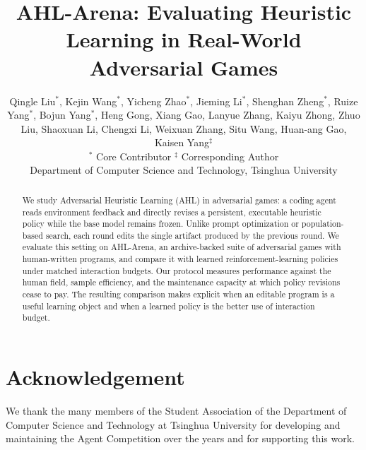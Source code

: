 \documentclass{article}
\title{AHL-Arena: Evaluating Heuristic Learning in Real-World Adversarial Games}
\author{Qingle Liu$^{*}$, Kejin Wang$^{*}$, Yicheng Zhao$^{*}$, Jieming Li$^{*}$, Shenghan Zheng$^{*}$, Ruize Yang$^{*}$, Bojun Yang$^{*}$, Heng Gong, Xiang Gao, Lanyue Zhang, Kaiyu Zhong, Zhuo Liu, Shaoxuan Li, Chengxi Li, Weixuan Zhang, Situ Wang, Huan-ang Gao, Kaisen Yang$^{\ddagger}$\\[3pt]
\small $^{*}$ Core Contributor \quad $^{\ddagger}$ Corresponding Author\\
\small Department of Computer Science and Technology, Tsinghua University\\
}
\newcommand{\benchname}{\mbox{AHL-Arena}\xspace}
\newcommand{\ahl}{AHL\xspace}
\begin{document}
\maketitle
\begin{abstract}
We study Adversarial Heuristic Learning (\ahl) in adversarial games: a coding agent reads
environment feedback and directly revises a persistent, executable heuristic
policy while the base model remains frozen. Unlike prompt optimization or
population-based search, each round edits the single artifact produced by the
previous round. We evaluate this setting on \benchname, an archive-backed suite
of adversarial games with human-written programs, and compare it with learned
reinforcement-learning policies under matched interaction budgets. Our protocol
measures performance against the human field, sample efficiency, and the
maintenance capacity at which policy revisions cease to pay. The resulting
comparison makes explicit when an editable program is a useful learning object
and when a learned policy is the better use of interaction budget.
\end{abstract}







\section*{Acknowledgement}
We thank the many members of the Student Association of the Department of Computer Science and Technology at Tsinghua University for developing and maintaining the Agent Competition over the years and for supporting this work.



\end{document}
